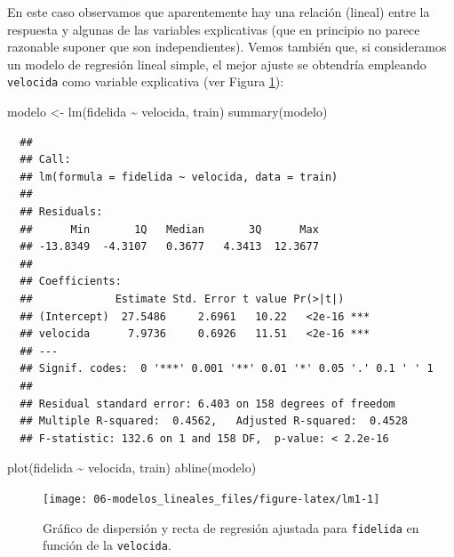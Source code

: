 \documentclass[
]{book}
\newenvironment{Shaded}{\begin{snugshade}}{\end{snugshade}}
\newcommand{\FunctionTok}[1]{\textcolor[rgb]{0.00,0.00,0.00}{#1}}
\newcommand{\NormalTok}[1]{#1}
\newcommand{\OtherTok}[1]{\textcolor[rgb]{0.56,0.35,0.01}{#1}}
\newcommand{\SpecialCharTok}[1]{\textcolor[rgb]{0.00,0.00,0.00}{#1}}
\theoremstyle{break}
\theoremstyle{nonumberplain}
\begin{document}
En este caso observamos que aparentemente hay una relación (lineal) entre la respuesta y algunas de las variables explicativas (que en principio no parece razonable suponer que son independientes).
Vemos también que, si consideramos un modelo de regresión lineal simple, el mejor ajuste se obtendría empleando \texttt{velocida} como variable explicativa (ver Figura \ref{fig:lm1}):



\begin{Shaded}
\begin{Highlighting}[]
\NormalTok{modelo }\OtherTok{\textless{}{-}} \FunctionTok{lm}\NormalTok{(fidelida }\SpecialCharTok{\textasciitilde{}}\NormalTok{ velocida, train)}
\FunctionTok{summary}\NormalTok{(modelo)}
\end{Highlighting}
\end{Shaded}

\begin{verbatim}
  ## 
  ## Call:
  ## lm(formula = fidelida ~ velocida, data = train)
  ## 
  ## Residuals:
  ##      Min       1Q   Median       3Q      Max 
  ## -13.8349  -4.3107   0.3677   4.3413  12.3677 
  ## 
  ## Coefficients:
  ##             Estimate Std. Error t value Pr(>|t|)    
  ## (Intercept)  27.5486     2.6961   10.22   <2e-16 ***
  ## velocida      7.9736     0.6926   11.51   <2e-16 ***
  ## ---
  ## Signif. codes:  0 '***' 0.001 '**' 0.01 '*' 0.05 '.' 0.1 ' ' 1
  ## 
  ## Residual standard error: 6.403 on 158 degrees of freedom
  ## Multiple R-squared:  0.4562,   Adjusted R-squared:  0.4528 
  ## F-statistic: 132.6 on 1 and 158 DF,  p-value: < 2.2e-16
\end{verbatim}

\begin{Shaded}
\begin{Highlighting}[]
\FunctionTok{plot}\NormalTok{(fidelida }\SpecialCharTok{\textasciitilde{}}\NormalTok{ velocida, train)}
\FunctionTok{abline}\NormalTok{(modelo)}
\end{Highlighting}
\end{Shaded}

\begin{figure}[!htb]

{\centering \texttt{[image: 06-modelos\_lineales\_files/figure-latex/lm1-1]} 

}

\caption{Gráfico de dispersión y recta de regresión ajustada para \texttt{fidelida} en función de la \texttt{velocida}.}\label{fig:lm1}
\end{figure}
\end{document}
